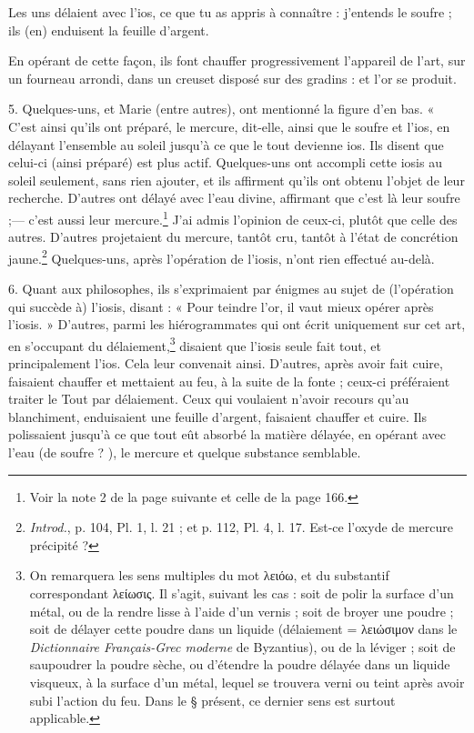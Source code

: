 \documentclass[a4paper, 11pt, oneside, polutonikogreek, french]{article}
\begin{document}
Les uns délaient avec l'ios, ce que tu as appris à connaître : j'entends le soufre ; ils (en) enduisent la feuille d'argent.

En opérant de cette façon, ils font chauffer progressivement l'appareil de l'art, sur un fourneau arrondi, dans un creuset disposé sur des gradins : et l'or se produit.

5. Quelques-uns, et Marie (entre autres), ont mentionné la figure d'en bas. « C'est ainsi qu'ils ont préparé, le mercure, dit-elle, ainsi que le soufre et l'ios, en délayant l'ensemble au soleil jusqu'à ce que le tout devienne ios. Ils disent que celui-ci (ainsi préparé) est plus actif. Quelques-uns ont accompli cette iosis au soleil seulement, sans rien ajouter, et ils affirment qu'ils ont obtenu l'objet de leur recherche. D'autres ont délayé avec l'eau divine, affirmant que c'est là leur soufre ;--- c'est aussi leur mercure.\footnote{Voir la note 2 de la page suivante et celle de la page 166.} J'ai admis l'opinion de ceux-ci, plutôt que celle des autres. D'autres projetaient du mercure, tantôt cru, tantôt à l'état de concrétion jaune.\footnote{\emph{Introd.}, p. 104, Pl. 1, l. 21 ; et p. 112, Pl. 4, l. 17. Est-ce l'oxyde de mercure précipité ?} Quelques-uns, après l'opération de l'iosis, n'ont rien effectué au-delà.

6. Quant aux philosophes, ils s'exprimaient par énigmes au sujet de (l'opération qui succède à) l'iosis, disant : « Pour teindre l'or, il vaut mieux opérer après l'iosis. » D'autres, parmi les hiérogrammates qui ont écrit uniquement sur cet art, en s'occupant du délaiement,\footnote{On remarquera les sens multiples du mot λειόω, et du substantif correspondant λείωσις. Il s'agit, suivant les cas : soit de polir la surface d'un métal, ou de la rendre lisse à l'aide d'un vernis ; soit de broyer une poudre ; soit de délayer cette poudre dans un liquide (délaiement = λειώσιμον dans le \emph{Dictionnaire Français-Grec moderne} de Byzantius), ou de la léviger ; soit de saupoudrer la poudre sèche, ou d'étendre la poudre délayée dans un liquide visqueux, à la surface d'un métal, lequel se trouvera verni ou teint après avoir subi l'action du feu. Dans le § présent, ce dernier sens est surtout applicable.} disaient que l'iosis seule fait tout, et principalement l'ios. Cela leur convenait ainsi. D'autres, après avoir fait cuire, faisaient chauffer et mettaient au feu, à la suite de la fonte ; ceux-ci préféraient traiter le Tout par délaiement. Ceux qui voulaient n'avoir recours qu'au blanchiment, enduisaient une feuille d'argent, faisaient chauffer et cuire. Ils polissaient jusqu'à ce que tout eût absorbé la matière délayée, en opérant avec l'eau (de soufre ? ), le mercure et quelque substance semblable.
\end{document}
